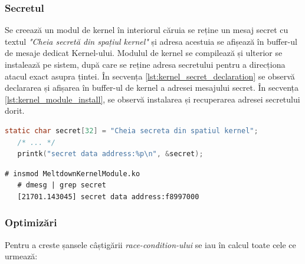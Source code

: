 \subsubsection{Secretul}

Se creează un modul de kernel în interiorul căruia se reține un mesaj secret
cu textul \emph{"Cheia secretă din spațiul kernel"} și adresa acestuia se
afișează în buffer-ul de mesaje dedicat Kernel-ului. Modulul de kernel se
compilează și ulterior se instalează pe sistem, după care se reține adresa
secretului pentru a direcționa atacul exact asupra țintei. În secvența
\ref{lst:kernel_secret_declaration} se observă declararea și afișarea în
buffer-ul de kernel a adresei mesajului secret. În secvența
\ref{lst:kernel_module_install}, se observă instalarea și recuperarea adresei
secretului dorit.

\begin{lstlisting}[language=c, caption=Declararea secretului și afișarea adresei,
                   label=lst:kernel_secret_declaration ]
   static char secret[32] = "Cheia secreta din spatiul kernel";
   /* ... */
   printk("secret data address:%p\n", &secret);      
\end{lstlisting}

\begin{lstlisting}[caption=Instalarea modulului. Aflarea adresei secretului numit "secret",
                   label=lst:kernel_module_install]
   # insmod MeltdownKernelModule.ko
   # dmesg | grep secret
   [21701.143045] secret data address:f8997000
\end{lstlisting}

\subsubsection{Optimizări}
 
Pentru a creste șansele câștigării \emph{race-condition-ului} se iau în calcul toate
cele ce urmează:

